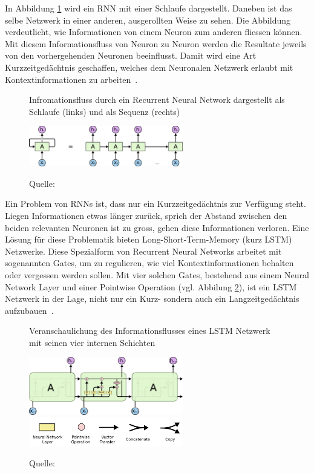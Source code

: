 In Abbildung \ref{rnn1} wird ein RNN mit einer Schlaufe dargestellt. Daneben ist das selbe Netzwerk in einer anderen, ausgerollten Weise zu sehen. Die Abbildung verdeutlicht, wie Informationen von einem Neuron zum anderen fliessen können. Mit diesem Informationsfluss von Neuron zu Neuron werden die Resultate jeweils von den vorhergehenden Neuronen beeinflusst. Damit wird eine Art Kurzzeitgedächtnis geschaffen, welches dem Neuronalen Netzwerk erlaubt mit Kontextinformationen zu arbeiten~\autocite{Olah2015}.
\begin{figure}[h]
    \captionsetup{width=.8\linewidth}
    \caption{Infromationsfluss durch ein Recurrent Neural Network dargestellt als Schlaufe (links) und als Sequenz (rechts)}
    \label{rnn1}
    \centering
    \vspace{0.2cm}
    \includegraphics[width=0.6\textwidth]{graphics/rnn1.png}\\
    \vspace{0.3cm}
    \caption*{Quelle: \textcite{Olah2015}}
\end{figure}

Ein Problem von RNNs ist, dass nur ein Kurzzeitgedächtnis zur Verfügung steht. Liegen Informationen etwas länger zurück, sprich der Abstand zwischen den beiden relevanten Neuronen ist zu gross, gehen diese Informationen verloren. Eine Lösung für diese Problematik bieten Long-Short-Term-Memory (kurz LSTM) Netzwerke. Diese Spezialform von Recurrent Neural Networks arbeitet mit sogenannten Gates, um zu regulieren, wie viel Kontextinformationen behalten oder vergessen werden sollen. Mit vier solchen Gates, bestehend aus einem Neural Network Layer und einer Pointwise Operation (vgl. Abbilung \ref{lstm1}), ist ein LSTM Netzwerk in der Lage, nicht nur ein Kurz- sondern auch ein Langzeitgedächtnis aufzubauen~\autocite{Olah2015}.
\begin{figure}[h]
    \captionsetup{width=.8\linewidth}
    \caption{Veranschaulichung des Informationsflusses eines LSTM Netzwerk mit seinen vier internen Schichten}
    \label{lstm1}
    \centering
    \includegraphics[width=0.6\textwidth]{graphics/lstm.png}\\
    \vspace{0.5cm}
    \includegraphics[width=0.6\textwidth]{graphics/lstm-notation.png}\\
    \vspace{0.1cm}
    \caption*{Quelle: \textcite{Olah2015}}
\end{figure}

